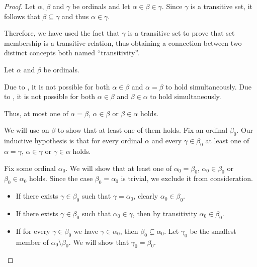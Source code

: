 \begin{proof}
   Let \( \alpha \), \( \beta \) and \( \gamma \) be ordinals and let \( \alpha \in \beta \in \gamma \). Since \( \gamma \) is a transitive set, it follows that \( \beta \subseteq \gamma \) and thus \( \alpha \in \gamma \).

  Therefore, we have used the fact that \( \gamma \) is a transitive set to prove that set membership is a transitive relation, thus obtaining a connection between two distinct concepts both named \enquote{transitivity}.

   Let \( \alpha \) and \( \beta \) be ordinals.

  Due to , it is not possible for both \( \alpha \in \beta \) and \( \alpha = \beta \) to hold simultaneously. Due to , it is not possible for both \( \alpha \in \beta \) and \( \beta \in \alpha \) to hold simultaneously.

  Thus, at most one of \( \alpha = \beta \), \( \alpha \in \beta \) or \( \beta \in \alpha \) holds.

  We will use  on \( \beta \) to show that at least one of them holds. Fix an ordinal \( \beta_0 \). Our inductive hypothesis is that for every ordinal \( \alpha \) and every \( \gamma \in \beta_0 \) at least one of \( \alpha = \gamma \), \( \alpha \in \gamma \) or \( \gamma \in \alpha \) holds.

  Fix some ordinal \( \alpha_0 \). We will show that at least one of \( \alpha_0 = \beta_0 \), \( \alpha_0 \in \beta_0 \) or \( \beta_0 \in \alpha_0 \) holds. Since the case \( \beta_0 = \alpha_0 \) is trivial, we exclude it from consideration.

  \begin{itemize}
    \item If there exists \( \gamma \in \beta_0 \) such that \( \gamma = \alpha_0 \), clearly \( \alpha_0 \in \beta_0 \).
    \item If there exists \( \gamma \in \beta_0 \) such that \( \alpha_0 \in \gamma \), then by transitivity \( \alpha_0 \in \beta_0 \).
    \item If for every \( \gamma \in \beta_0 \) we have \( \gamma \in \alpha_0 \), then \( \beta_0 \subsetneq \alpha_0 \). Let \( \gamma_0 \) be the smallest member of \( \alpha_0 \setminus \beta_0 \). We will show that \( \gamma_0 = \beta_0 \).


\end{itemize}
\end{proof}
